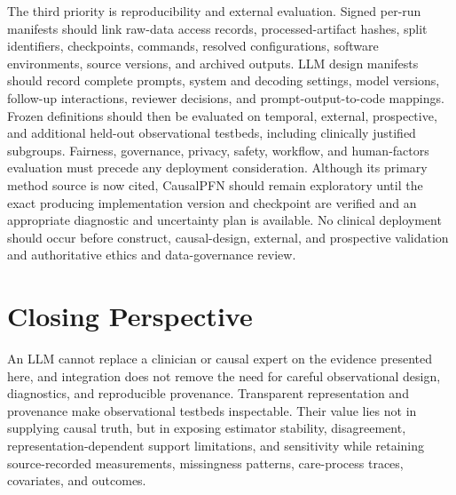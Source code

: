 The third priority is reproducibility and external evaluation.  Signed per-run manifests should link raw-data access records, processed-artifact hashes, split identifiers, checkpoints, commands, resolved configurations, software environments, source versions, and archived outputs.  LLM design manifests should record complete prompts, system and decoding settings, model versions, follow-up interactions, reviewer decisions, and prompt-output-to-code mappings.  Frozen definitions should then be evaluated on temporal, external, prospective, and additional held-out observational testbeds, including clinically justified subgroups.  Fairness, governance, privacy, safety, workflow, and human-factors evaluation must precede any deployment consideration.  Although its primary method source is now cited, CausalPFN should remain exploratory until the exact producing implementation version and checkpoint are verified and an appropriate diagnostic and uncertainty plan is available.  No clinical deployment should occur before construct, causal-design, external, and prospective validation and authoritative ethics and data-governance review.

\section{Closing Perspective}
\label{sec:conclusions-future-work:closing-perspective}

An LLM cannot replace a clinician or causal expert on the evidence presented here, and integration does not remove the need for careful observational design, diagnostics, and reproducible provenance.  Transparent representation and provenance make observational testbeds inspectable.  Their value lies not in supplying causal truth, but in exposing estimator stability, disagreement, representation-dependent support limitations, and sensitivity while retaining source-recorded measurements, missingness patterns, care-process traces, covariates, and outcomes.
